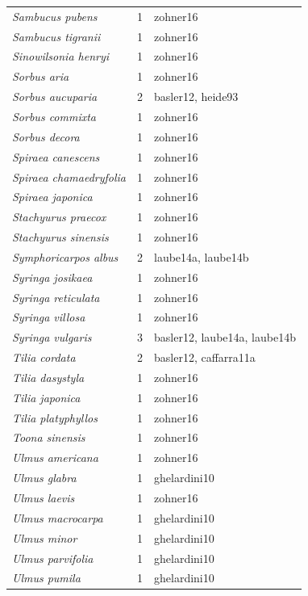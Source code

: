 \documentclass{article}
\begin{document}
\begin{footnotesize}
\begin{longtable}{p{}p{}p{}}
  \textit{Sambucus pubens} &   1 & zohner16 \\ 
  \textit{Sambucus tigranii} &   1 & zohner16 \\ 
  \textit{Sinowilsonia henryi} &   1 & zohner16 \\ 
  \textit{Sorbus aria} &   1 & zohner16 \\ 
  \textit{Sorbus aucuparia} &   2 & basler12, heide93 \\ 
  \textit{Sorbus commixta} &   1 & zohner16 \\ 
  \textit{Sorbus decora} &   1 & zohner16 \\ 
  \textit{Spiraea canescens} &   1 & zohner16 \\ 
  \textit{Spiraea chamaedryfolia} &   1 & zohner16 \\ 
  \textit{Spiraea japonica} &   1 & zohner16 \\ 
  \textit{Stachyurus praecox} &   1 & zohner16 \\ 
  \textit{Stachyurus sinensis} &   1 & zohner16 \\ 
  \textit{Symphoricarpos albus} &   2 & laube14a, laube14b \\ 
  \textit{Syringa josikaea} &   1 & zohner16 \\ 
  \textit{Syringa reticulata} &   1 & zohner16 \\ 
  \textit{Syringa villosa} &   1 & zohner16 \\ 
  \textit{Syringa vulgaris} &   3 & basler12, laube14a, laube14b \\ 
  \textit{Tilia cordata} &   2 & basler12, caffarra11a \\ 
  \textit{Tilia dasystyla} &   1 & zohner16 \\ 
  \textit{Tilia japonica} &   1 & zohner16 \\ 
  \textit{Tilia platyphyllos} &   1 & zohner16 \\ 
  \textit{Toona sinensis} &   1 & zohner16 \\ 
  \textit{Ulmus americana} &   1 & zohner16 \\ 
  \textit{Ulmus glabra} &   1 & ghelardini10 \\ 
  \textit{Ulmus laevis} &   1 & zohner16 \\ 
  \textit{Ulmus macrocarpa} &   1 & ghelardini10 \\ 
  \textit{Ulmus minor} &   1 & ghelardini10 \\ 
  \textit{Ulmus parvifolia} &   1 & ghelardini10 \\ 
  \textit{Ulmus pumila} &   1 & ghelardini10 \\ 

\end{longtable}
\end{footnotesize}
\end{document}
